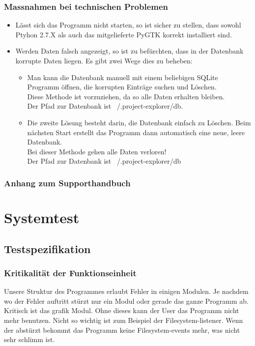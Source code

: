 \documentclass[10pt,paper=a4,final]{scrartcl}
\begin{document}
\subsubsection{Massnahmen bei technischen Problemen}
\begin{itemize}
\item L\"asst sich das Programm nicht starten, so ist sicher zu stellen, dass sowohl Ptyhon 2.7.X als auch das mitgelieferte PyGTK korrekt installiert sind.
\item Werden Daten falsch angezeigt, so ist zu bef\"urchten, dass in der Datenbank korrupte Daten liegen. Es gibt zwei Wege dies zu beheben:
\begin{itemize}
\item Man kann die Datenbank manuell mit einem beliebigen SQLite Programm \"offnen, die korrupten Eintr\"age suchen und L\"oschen.\\ Diese Methode ist vorzuziehen, da so alle Daten erhalten bleiben.\\ Der Pfad zur Datenbank ist ~/.project-explorer/db.
\item Die zweite L\"osung besteht darin, die Datenbank einfach zu L\"oschen. Beim n\"achsten Start erstellt das Programm dann automatisch eine neue, leere Datenbank.\\ Bei dieser Methode gehen alle Daten verloren!\\ Der Pfad zur Datenbank ist ~/.project-explorer/db
\end{itemize}
\end{itemize}
\subsubsection{Anhang zum Supporthandbuch}
\section{Systemtest}
\subsection{Testspezifikation}
\subsubsection{Kritikalit\"at der Funktionseinheit}
Unsere Struktur des Programmes erlaubt Fehler in einigen Modulen. Je nachdem wo der Fehler auftritt stürzt nur ein Modul oder gerade das ganze Programm ab. Kritisch ist das grafik Modul. Ohne dieses kann der User das Programm nicht mehr benutzen. Nicht so wichtig ist zum Beispiel der Filesystem-listener. Wenn der abstürzt bekommt das Programm keine Filesystem-events mehr, was nicht sehr schlimm ist.
\end{document}
